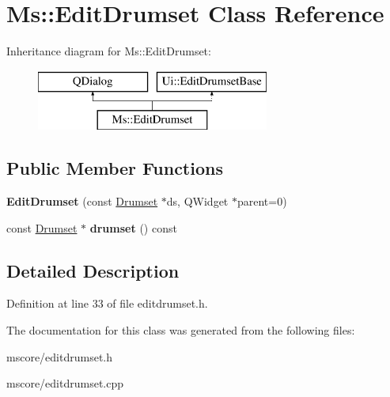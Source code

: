 \hypertarget{class_ms_1_1_edit_drumset}{}\section{Ms\+:\+:Edit\+Drumset Class Reference}
\label{class_ms_1_1_edit_drumset}
Inheritance diagram for Ms\+:\+:Edit\+Drumset\+:\begin{figure}[H]
\begin{center}
\leavevmode
\includegraphics[height=2.000000cm]{class_ms_1_1_edit_drumset}
\end{center}
\end{figure}
\subsection*{Public Member Functions}
\begin{DoxyCompactItemize}
\item 
\mbox{\label{class_ms_1_1_edit_drumset_a499a0f209b6712c842350a5ea9c4b399}} 
{\bfseries Edit\+Drumset} (const \hyperlink{class_ms_1_1_drumset}{Drumset} $\ast$ds, Q\+Widget $\ast$parent=0)
\item 
\mbox{\label{class_ms_1_1_edit_drumset_a84dfb7d0f1f16450c0427880dda5dc71}} 
const \hyperlink{class_ms_1_1_drumset}{Drumset} $\ast$ {\bfseries drumset} () const
\end{DoxyCompactItemize}


\subsection{Detailed Description}


Definition at line 33 of file editdrumset.\+h.



The documentation for this class was generated from the following files\+:\begin{DoxyCompactItemize}
\item 
mscore/editdrumset.\+h\item 
mscore/editdrumset.\+cpp\end{DoxyCompactItemize}
